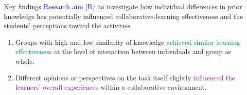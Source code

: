 \begin{frame}{Key findings}
    \textcolor{blue}{Research aim [B]}: to investigate how individual differences in prior knowledge has potentially influenced collaborative-learning effectiveness and the students’ perceptions toward the activities
    
    \begin{block}{}
        \begin{enumerate}
            \item <+-> Groups with high and low similarity of knowledge \textcolor{teal}{achieved similar learning effectiveness} at the level of interaction between individuals and group as whole.
            \item <+-> Different opinions or perspectives on the task itself slightly \textcolor{purple}{influenced the learners’ overall experiences} within a collaborative environment. 
        \end{enumerate}
    \end{block}
\end{frame}